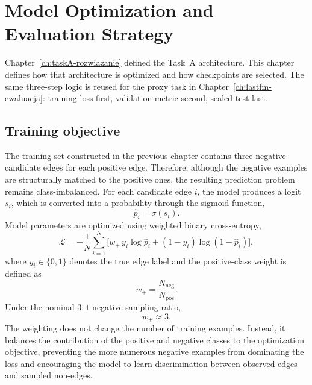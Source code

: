 \chapter{Model Optimization and Evaluation Strategy}
\label{ch:taskA-ewaluacja}

Chapter~\ref{ch:taskA-rozwiazanie} defined the Task~A architecture.
This chapter defines how that architecture is optimized and how checkpoints are selected.
The same three-step logic is reused for the proxy task in Chapter~\ref{ch:lastfm-ewaluacja}: training loss first, validation metric second, sealed test last.

\section{Training objective}
\label{sec:taskA-loss}

The training set constructed in the previous chapter contains three negative candidate edges for each positive edge.
Therefore, although the negative examples are structurally matched to the positive ones, the resulting prediction problem remains class-imbalanced.
For each candidate edge $i$, the model produces a logit $s_{i}$, which is converted into a probability through the sigmoid function,
\begin{equation}
\label{eq:taskA-sigmoid}
\hat{p}_{i}=\sigma(s_{i}).
\end{equation}
Model parameters are optimized using weighted binary cross-entropy,
\begin{equation}
\label{eq:taskA-bce}
\mathcal{L}
=
-\frac{1}{N}
\sum_{i=1}^{N}
\bigl[
w_{+}\, y_{i}\log\hat{p}_{i}
+(1-y_{i})\log(1-\hat{p}_{i})
\bigr],
\end{equation}
where $y_{i}\in\{0,1\}$ denotes the true edge label and the positive-class weight is defined as
\begin{equation}
\label{eq:taskA-wpos}
w_{+}=\frac{N_{\mathrm{neg}}}{N_{\mathrm{pos}}}.
\end{equation}
Under the nominal $3{:}1$ negative-sampling ratio,
\begin{equation}
w_{+}\approx 3.
\end{equation}
The weighting does not change the number of training examples.
Instead, it balances the contribution of the positive and negative classes to the optimization objective, preventing the more numerous negative examples from dominating the loss and encouraging the model to learn discrimination between observed edges and sampled non-edges.

